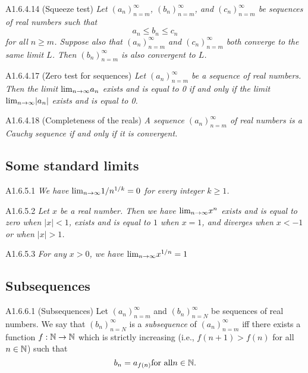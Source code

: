 \begin{corollary}{A1.6.4.14}
    (Squeeze test) \emph{Let $(a_n)_{n=m}^{\infty}$, $(b_n)_{n=m}^{\infty}$, and
    $(c_n)_{n=m}^{\infty}$ be sequences of real numbers such that
    \begin{equation*}
        a_n \leq b_n \leq c_n
    \end{equation*}
    for all $n \geq m$. Suppose also that $(a_n)_{n=m}^{\infty}$ and $(c_n)_{n=m}^{\infty}$
    both converge to the same limit $L$. Then $(b_n)_{n=m}^{\infty}$ is also convergent
    to $L$.}
\end{corollary}

\begin{corollary}{A1.6.4.17}
    (Zero test for sequences) \emph{Let $(a_n)_{n=m}^{\infty}$ be a sequence of real
    numbers. Then the limit $\text{lim}_{n \rightarrow \infty}{a_n}$ exists and is equal to 0 if and only if
    the limit $\text{lim}_{n \rightarrow \infty}{|a_n|}$ exists and is equal to 0.}
\end{corollary}

\begin{theorem}{A1.6.4.18}
    (Completeness of the reals) \emph{A sequence $(a_n)_{n=m}^{\infty}$ of real numbers
    is a Cauchy sequence if and only if it is convergent.}
\end{theorem}

\subsection{Some standard limits}
\begin{corollary}{A1.6.5.1}
    \emph{We have $\text{lim}_{n \rightarrow \infty}{1/n^{1/k}} = 0$ for every integer $k \geq 1$.}
\end{corollary}

\begin{lemma}{A1.6.5.2}
    \emph{Let $x$ be a real number. Then we have $\text{lim}_{n \rightarrow \infty}{x^n}$ exists and is equal
    to zero when $|x| < 1$, exists and is equal to $1$ when $x = 1$, and diverges
    when $x < -1$ or when $|x| > 1$.}
\end{lemma}

\begin{lemma}{A1.6.5.3}
    \emph{For any $x > 0$, we have $\text{lim}_{n \rightarrow \infty}{x^{1/n}} = 1$}
\end{lemma}

\subsection{Subsequences}
\begin{definition}{A1.6.6.1}
    (Subsequences) Let $(a_n)_{n=m}^{\infty}$ and $(b_n)_{n=N}^{\infty}$ be sequences
    of real numbers. We say that $(b_n)_{n=N}^{\infty}$ is a \emph{subsequence} of
    $(a_n)_{n=m}^{\infty}$ iff there exists a function $f: \mathbb{N} \to \mathbb{N}$
    which is strictly increasing (i.e., $f(n + 1) > f(n)$ for all $n \in \mathbb{N}$)
    such that
    \begin{equation*}
        b_n = a_{f(n)} \text{for all} n \in \mathbb{N}.
    \end{equation*}
\end{definition}

